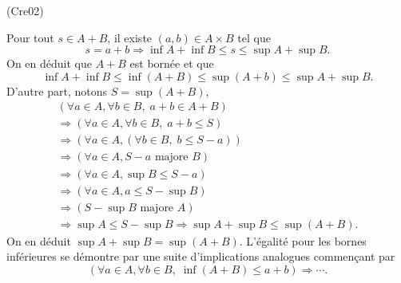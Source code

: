 \begin{tiny}(Cre02)\end{tiny} Pour tout $s \in A+B$, il existe $(a,b) \in A\times B$ tel que 
\[
 s = a + b \Rightarrow
 \inf A + \inf B \leq s \le \sup A + \sup B.
\]
On en déduit que $A+B$ est bornée et que
\[
 \inf A + \inf B \leq \inf(A+B) \leq \sup(A+b) \leq \sup A + \sup B.
\]
D'autre part, notons $S = \sup(A+B)$,
\begin{multline*}
 \left( \forall a \in A, \forall b \in B, \; a+b \in A+B\right) \\
 \Rightarrow
 \left( \forall a \in A, \forall b \in B, \; a+b \leq S \right) \\
 \Rightarrow
 \left( \forall a \in A, \left( \forall b \in B, \; b \leq S -a \right) \right) \\
 \Rightarrow
 \left( \forall a \in A,  S -a \text{ majore } B \right) \\
 \Rightarrow
 \left( \forall a \in A,  \sup B \leq S -a  \right) \\
 \Rightarrow
 \left( \forall a \in A,  a \leq S - \sup B  \right) \\
 \Rightarrow
 \left( S - \sup B \text{ majore } A\right) \\
 \Rightarrow \sup A \leq S - \sup B
 \Rightarrow \sup A + \sup B \leq \sup(A+B).
\end{multline*}
On en déduit $\sup A + \sup B = \sup(A+B)$.\newline
L'égalité pour les bornes inférieures se démontre par une suite d'implications analogues commençant par 
\[
 \left( \forall a \in A, \forall b \in B, \; \inf(A+B) \leq a + b  \right) \Rightarrow \cdots.
\]
